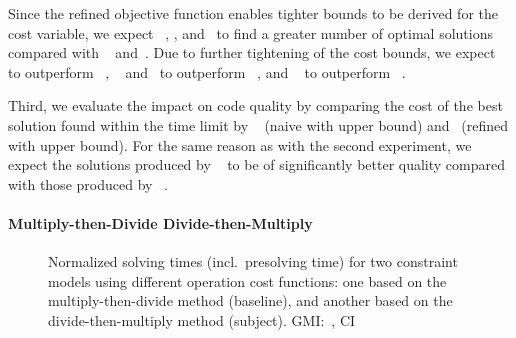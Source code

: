 Since the refined \gls{objective function} enables tighter bounds to be derived
for the \gls{cost variable}, we expect ~, ,
and~ to find a greater number of optimal
\glspl{solution} compared with ~ and~.
%
Due to further tightening of the cost bounds, we expect ~ to outperform ~, ~ and~
to outperform ~, and
~ to outperform
~.

Third, we evaluate the impact on code quality by comparing the cost of the best
\gls{solution} found within the time limit by ~ (naive  with
upper bound) and~ (refined  with upper bound).
%
For the same reason as with the second experiment, we expect the
\glspl{solution} produced by ~ to be of significantly better quality
compared with those produced by ~.


\paragraph{Multiply-then-Divide \versus Divide-then-Multiply}



\begin{figure}
  \centering%
  \maxsizebox{\textwidth}{!}{%
    \trimBarchartPlot{%
    }%
  }

  \caption[%
            Plot for evaluating the operation cost function's impact on
            solving time%
          ]%
          {%
            Normalized solving times (incl.\ presolving time) for two constraint
            models using different operation cost functions: one based on the
            multiply-then-divide method (baseline), and another based on the
            divide-then-multiply method (subject).
            GMI:~\printGMI{%
              \NewOpCostFunVsOldPrePlusSolvingTimeSpeedupPrePlusSolvingTimeRegularSpeedupGmean%
            },
            CI~\printGMICI{%
              \NewOpCostFunVsOldPrePlusSolvingTimeSpeedupPrePlusSolvingTimeRegularSpeedupCiMin%
            }{%
              \NewOpCostFunVsOldPrePlusSolvingTimeSpeedupPrePlusSolvingTimeRegularSpeedupCiMax%
            }%
          }
\end{figure}

